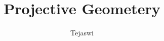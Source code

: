 \documentclass{report}
\begin{document}
\title{Projective Geometery}
\author{Tejaswi}
\date{}


\tableofcontents
\newpage
{}


\end{document}
